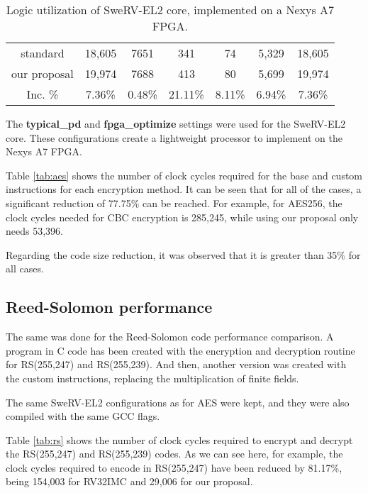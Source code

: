 \begin{table*}[tp]
\begin{tabular}{ccccccc}
    \cellcolor[HTML]{EFEFEF}standard     & 18,605                & 7651                 & 341                  & 74                   & 5,329   & 18,605                                   \\
    \cellcolor[HTML]{EFEFEF}our proposal  & 19,974                & 7688                 & 413                  & 80                   & 5,699   & 19,974                                   \\ \hline
    \cellcolor[HTML]{EFEFEF}Inc. \% & 7.36\%                     &    0.48\%                  & 21.11\%                     &  8.11\%                    & 6.94\% & 7.36\%                                           
    \end{tabular}
    \caption{Logic utilization of SweRV-EL2 core, implemented on a Nexys A7 FPGA.}
    \label{tab:area}
\end{table*}

The \textbf{typical\_pd} and \textbf{fpga\_optimize} settings were used for the SweRV-EL2 core. These configurations create a lightweight processor to implement on the Nexys A7 FPGA.

Table \ref{tab:aes} shows the number of clock cycles required for the base and custom instructions for each encryption method. It can be seen that for all of the cases, a significant reduction of 77.75\% can be reached. 
For example, for AES256, the clock cycles needed for CBC encryption is 285,245, while using our proposal only needs 53,396.

Regarding the code size reduction, it was observed that it is greater than 35\% for all cases.

\subsection{Reed-Solomon performance} 

The same was done for the Reed-Solomon code performance comparison. A program in C code has been created with the encryption and decryption routine for RS(255,247) and RS(255,239). And then, another 
version was created with the custom instructions, replacing the multiplication of finite fields.

The same SweRV-EL2 configurations as for AES were kept, and they were also compiled with the same GCC flags.

Table \ref{tab:rs} shows the number of clock cycles required to encrypt and decrypt the RS(255,247) and RS(255,239) codes. 
As we can see here, for example, the clock cycles required to encode in RS(255,247) have been reduced by 81.17\%, 
being 154,003 for RV32IMC and 29,006 for our proposal.

